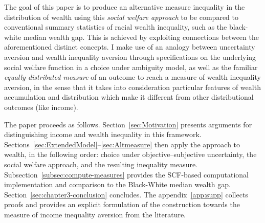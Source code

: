 \documentclass[../../../00-main.tex]{subfiles}
\begin{document}
\par The goal of this paper is to produce an alternative measure inequality in the distribution of wealth using this \textit{social welfare approach} to be compared to conventional summary statistics of racial wealth inequality, such as the black-white median wealth gap. This is achieved by exploiting connections between the aforementioned distinct concepts. I make use of an analogy between uncertainty aversion and wealth inequality aversion through specifications on the underlying social welfare function in a choice under ambiguity model, as well as the familiar \textit{equally distributed measure} of an outcome to reach a measure of wealth inequality aversion, in the sense that it takes into consideration particular features of wealth accumulation and distribution which make it different from other distributional outcomes (like income). 
\par The paper proceeds as follows. Section~\ref{sec:Motivation} presents arguments for distinguishing income and wealth inequality in this framework. Sections~\ref{sec:ExtendedModel}--\ref{sec:Altmeasure} then apply the approach to wealth, in the following order: choice under objective--subjective uncertainty, the social welfare approach, and the resulting inequality measure. Subsection~\ref{subsec:compute-measures} provides the SCF-based computational implementation and comparison to the Black-White median wealth gap. Section~\ref{sec:chapter3-conclusion} concludes. The appendix~\ref{app:supp} collects proofs and provides an explicit formulation of the construction towards the measure of income inequality aversion from the literature.
\end{document}
